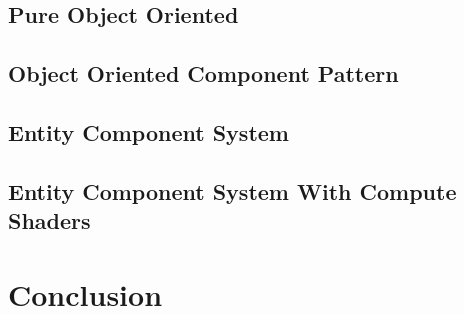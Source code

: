 \documentclass{article}
\begin{document}
\subsection{Pure Object Oriented}

\subsection{Object Oriented Component Pattern}

\subsection{Entity Component System}

\subsection{Entity Component System With Compute Shaders}

\section{Conclusion}
\end{document}
